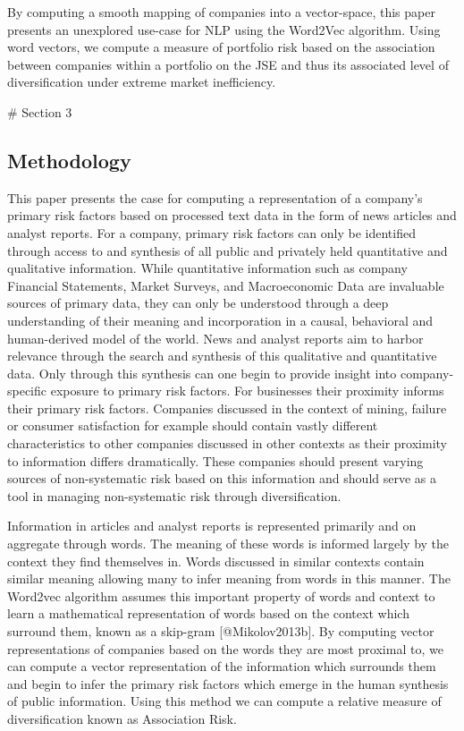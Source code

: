 \documentclass[11pt]{article}
\begin{document}
By computing a smooth mapping of companies into a vector-space, this
paper presents an unexplored use-case for NLP using the Word2Vec
algorithm. Using word vectors, we compute a measure of portfolio risk
based on the association between companies within a portfolio on the JSE
and thus its associated level of diversification under extreme market
inefficiency.

\newpage \# Section 3

\hypertarget{methodology}{%
\subsection{Methodology}\label{methodology}}

This paper presents the case for computing a representation of a
company's primary risk factors based on processed text data in the form
of news articles and analyst reports. For a company, primary risk
factors can only be identified through access to and synthesis of all
public and privately held quantitative and qualitative information.
While quantitative information such as company Financial Statements,
Market Surveys, and Macroeconomic Data are invaluable sources of primary
data, they can only be understood through a deep understanding of their
meaning and incorporation in a causal, behavioral and human-derived
model of the world. News and analyst reports aim to harbor relevance
through the search and synthesis of this qualitative and quantitative
data. Only through this synthesis can one begin to provide insight into
company-specific exposure to primary risk factors. For businesses their
proximity informs their primary risk factors. Companies discussed in the
context of mining, failure or consumer satisfaction for example should
contain vastly different characteristics to other companies discussed in
other contexts as their proximity to information differs dramatically.
These companies should present varying sources of non-systematic risk
based on this information and should serve as a tool in managing
non-systematic risk through diversification.

Information in articles and analyst reports is represented primarily and
on aggregate through words. The meaning of these words is informed
largely by the context they find themselves in. Words discussed in
similar contexts contain similar meaning allowing many to infer meaning
from words in this manner. The Word2vec algorithm assumes this important
property of words and context to learn a mathematical representation of
words based on the context which surround them, known as a skip-gram
{[}@Mikolov2013b{]}. By computing vector representations of companies
based on the words they are most proximal to, we can compute a vector
representation of the information which surrounds them and begin to
infer the primary risk factors which emerge in the human synthesis of
public information. Using this method we can compute a relative measure
of diversification known as Association Risk.
\end{document}

